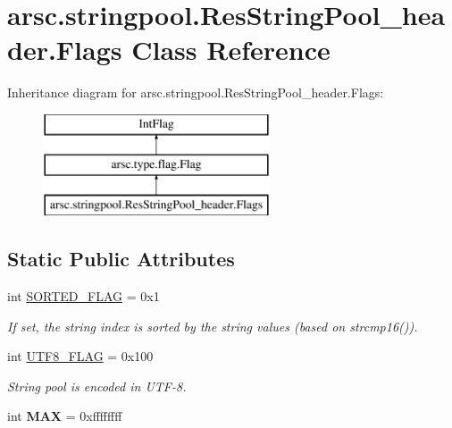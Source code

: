 \hypertarget{classarsc_1_1stringpool_1_1ResStringPool__header_1_1Flags}{}\section{arsc.\+stringpool.\+Res\+String\+Pool\+\_\+header.\+Flags Class Reference}
\label{classarsc_1_1stringpool_1_1ResStringPool__header_1_1Flags}
Inheritance diagram for arsc.\+stringpool.\+Res\+String\+Pool\+\_\+header.\+Flags\+:\begin{figure}[H]
\begin{center}
\leavevmode
\includegraphics[height=3.000000cm]{classarsc_1_1stringpool_1_1ResStringPool__header_1_1Flags}
\end{center}
\end{figure}
\subsection*{Static Public Attributes}
\begin{DoxyCompactItemize}
\item 
int \mbox{\hyperlink{classarsc_1_1stringpool_1_1ResStringPool__header_1_1Flags_af354a9864bce5baf864b5c5ea951bead}{S\+O\+R\+T\+E\+D\+\_\+\+F\+L\+AG}} = 0x1
\begin{DoxyCompactList}\small\item\em If set, the string index is sorted by the string values (based on strcmp16()). \end{DoxyCompactList}\item 
\mbox{\label{classarsc_1_1stringpool_1_1ResStringPool__header_1_1Flags_a58e87ceaf5312e23a80606d2584c7c52}} 
int \mbox{\hyperlink{classarsc_1_1stringpool_1_1ResStringPool__header_1_1Flags_a58e87ceaf5312e23a80606d2584c7c52}{U\+T\+F8\+\_\+\+F\+L\+AG}} = 0x100
\begin{DoxyCompactList}\small\item\em String pool is encoded in U\+T\+F-\/8. \end{DoxyCompactList}\item 
\mbox{\label{classarsc_1_1stringpool_1_1ResStringPool__header_1_1Flags_afe8f5b6207d6732e9430600b0922c47e}} 
int {\bfseries M\+AX} = 0xffffffff
\end{DoxyCompactItemize}
